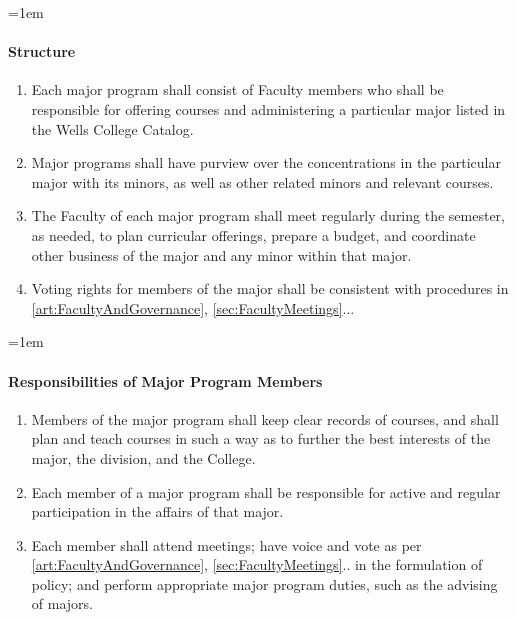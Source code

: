 \documentclass{manual}
\let\oldparagraph\paragraph
\renewcommand\paragraph{\leftskip=1em\oldparagraph}
\newcommand{\itemLevelA}{\alph*.}
\newcommand{\itemRefA}{\alph*}
\begin{document}
\paragraph{Structure}
\begin{enumerate}[label=\itemLevelA,ref=\itemRefA]

\item Each major program shall consist of Faculty members who shall be responsible for offering courses and administering a particular major listed in the Wells College Catalog.

\item Major programs shall have purview over the concentrations in the particular major with its minors, as well as other related minors and relevant courses.

\item The Faculty of each major program shall meet regularly during the semester, as needed, to plan curricular offerings, prepare a budget, and coordinate other business of the major and any minor within that major.

\item Voting rights for members of the major shall be consistent with procedures in \cref{art:FacultyAndGovernance}, \cref{sec:FacultyMeetings}... 
\end{enumerate}


\paragraph{Responsibilities of Major Program Members}
\begin{enumerate}[label=\itemLevelA,ref=\itemRefA]

\item Members of the major program shall keep clear records of courses, and shall plan and teach courses in such a way as to further the best interests of the major, the division, and the College.

\item Each member of a major program shall be responsible for active and regular participation in the affairs of that major.

\item Each member shall attend meetings; have voice and vote as per \cref{art:FacultyAndGovernance}, \cref{sec:FacultyMeetings}.. in the formulation of policy; and perform appropriate major program duties, such as the advising of majors.
\end{enumerate}
\end{document}
